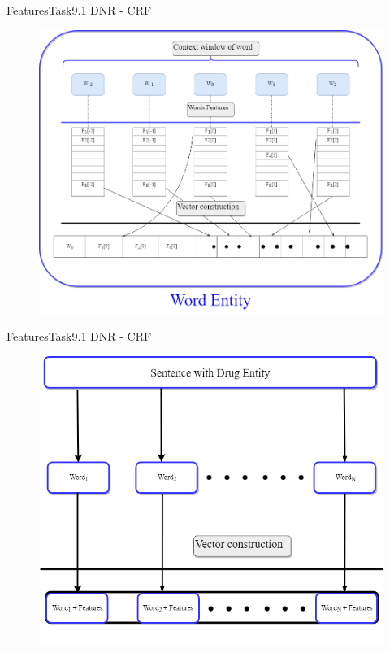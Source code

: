 \documentclass[xcolor=table]{beamer}
\begin{document}
\begin{frame}{Features}{Task9.1 DNR - CRF}
\begin{figure}
\includegraphics[scale=0.25]{wordEntity.png}
\end{figure}
\end{frame}



\begin{frame}{Features}{Task9.1 DNR - CRF}
\begin{figure}
\includegraphics[scale=0.3]{CRF.png}
\end{figure}
\end{frame}
\end{document}

